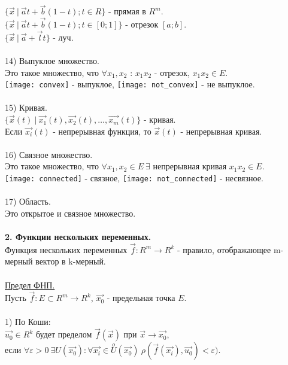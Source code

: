 \documentclass[12pt]{article}
\begin{document}
$\{ \overrightarrow{x} \ | \ \overrightarrow{a} t + \overrightarrow{b} (1-t); t \in R \}$ - прямая в $R^m$.\\
$\{ \overrightarrow{x} \ | \ \overrightarrow{a} t + \overrightarrow{b} (1-t); t \in [0; 1] \}$ - отрезок $[a; b]$.\\
$\{ \overrightarrow{x} \ | \ \overrightarrow{a} + \overrightarrow{l} t \}$ - луч.\\
\\
14) Выпуклое множество.\\
Это такое множество, что $\forall x_1, x_2$ : $x_1 x_2$ - отрезок, $x_1 x_2 \in E$.\\
\texttt{[image: convex]} - выпуклое, \texttt{[image: not\_convex]} - не выпуклое.\\
\\
15) Кривая.\\
$\{ \overrightarrow{x}(t) \ | \ \overrightarrow{x_1}(t), \overrightarrow{x_2}(t), \dots, \overrightarrow{x_m}(t) \}$ - кривая.\\
Если $\overrightarrow{x_i}(t)$ - непрерывная функция, то $\overrightarrow{x}(t)$ - непрерывная кривая.\\
\\
16) Связное множество.\\
Это такое множество, что $\forall x_1, x_2 \in E \ \exists$ непрерывная кривая $x_1 x_2 \in E$.\\
\texttt{[image: connected]} - связное, \texttt{[image: not\_connected]} - несвязное.\\
\\
17) Область.\\
Это открытое и связное множество.\\
\\
\label{question2_1}\textbf{2. Функции нескольких переменных.}\\
Функция нескольких переменных $\overrightarrow{f} : R^m \rightarrow R^k$ - правило, отображающее m-мерный вектор в k-мерный.\\
\\
\label{question2_2}\underline{Предел ФНП.}\\
Пусть $\overrightarrow{f} : E \subset R^m \rightarrow R^k$, $\overrightarrow{x_0}$ - предельная точка $E$.\\
\\
1) По Коши:\\
$\overrightarrow{u_0} \in R^k$ будет пределом $\overrightarrow{f}(\overrightarrow{x})$ при $\overrightarrow{x} \rightarrow \overrightarrow{x_0}$, \\если $\forall \varepsilon > 0 \ \exists U (\overrightarrow{x_0}) : \forall \overrightarrow{x_i} \in \overset{o}{U} (\overrightarrow{x_0}) \ \rho (\overrightarrow{f}(\overrightarrow{x_i}), \overrightarrow{u_0}) < \varepsilon)$.\\
\end{document}
